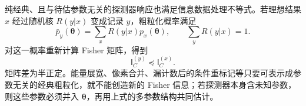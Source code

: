 纯经典、且与待估参数无关的探测器响应也满足信息数据处理不等式。若理想结果 $x$ 经过随机核 $R(y|x)$ 变成记录 $y$，粗粒化概率满足
\begin{equation}
\boxed{
\bar p_y(\boldsymbol\theta)=\sum_xR(y|x)p_x(\boldsymbol\theta),
\qquad
\sum_yR(y|x)=1.}
\label{eq:classical_detector_coarse_graining}
\end{equation}
对这一概率重新计算 Fisher 矩阵，得到
\begin{equation}
 \boxed{
 \mathsf I_C^{(y)}\preceq\mathsf I_C^{(x)}.}
 \label{eq:fisher-data-processing-dp31}
\end{equation}
矩阵差为半正定。能量展宽、像素合并、漏计数后的条件重标记等只要可表示成参数无关的经典粗粒化，就不能创造新的 Fisher 信息；若探测器本身含未知参数，则这些参数必须并入 $\boldsymbol\theta$，再用上式的多参数结构共同估计。

